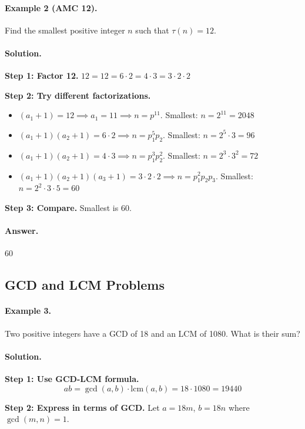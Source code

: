 \documentclass[12pt]{extarticle}
\begin{document}
\paragraph{Example 2 (AMC 12).} Find the smallest positive integer $n$ such that $\tau(n) = 12$.

\paragraph{Solution.}
\textbf{Step 1: Factor 12.} $12 = 12 = 6 \cdot 2 = 4 \cdot 3 = 3 \cdot 2 \cdot 2$

\textbf{Step 2: Try different factorizations.}
\begin{itemize}
    \item $(a_1+1) = 12 \implies a_1 = 11 \implies n = p^{11}$. Smallest: $n = 2^{11} = 2048$
    \item $(a_1+1)(a_2+1) = 6 \cdot 2 \implies n = p_1^5 p_2$. Smallest: $n = 2^5 \cdot 3 = 96$
    \item $(a_1+1)(a_2+1) = 4 \cdot 3 \implies n = p_1^3 p_2^2$. Smallest: $n = 2^3 \cdot 3^2 = 72$
    \item $(a_1+1)(a_2+1)(a_3+1) = 3 \cdot 2 \cdot 2 \implies n = p_1^2 p_2 p_3$. Smallest: $n = 2^2 \cdot 3 \cdot 5 = 60$
\end{itemize}

\textbf{Step 3: Compare.} Smallest is 60.

\paragraph{Answer.} $\boxed{60}$

\subsection{GCD and LCM Problems}

\paragraph{Example 3.} Two positive integers have a GCD of 18 and an LCM of 1080. What is their sum?

\paragraph{Solution.}
\textbf{Step 1: Use GCD-LCM formula.}
\[
ab = \gcd(a,b) \cdot \mathrm{lcm}(a,b) = 18 \cdot 1080 = 19440
\]

\textbf{Step 2: Express in terms of GCD.} Let $a = 18m$, $b = 18n$ where $\gcd(m,n)=1$.
\end{document}
